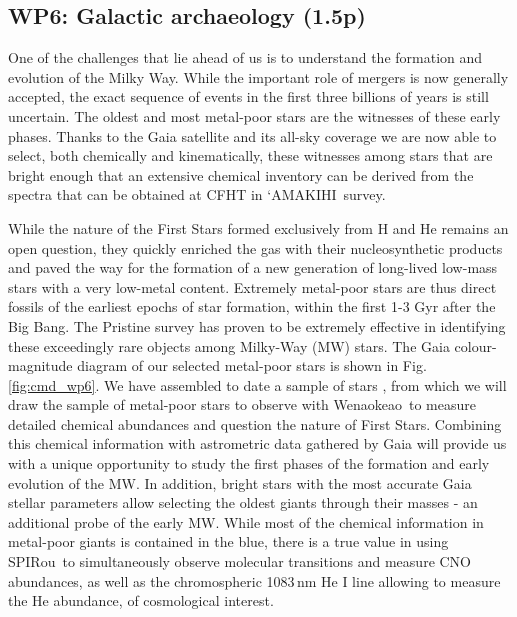 \documentclass[
    traditabstract,
    longauth,
    onecolumn,
]{aa}
\def \amakihi{`AMAKIHI}
\def \spi{SPIRou}
\def \wena{Wenaokeao}
\begin{document}
\subsection{WP6: Galactic archaeology (1.5p)}
One of the challenges that lie ahead of us is to understand the formation and evolution of the Milky Way. While the important role of mergers is now generally accepted, the exact sequence of events in the first three billions of years is still uncertain. The oldest and most metal-poor stars are the witnesses of these early phases. Thanks to the Gaia satellite and its all-sky coverage we are now able to select, both chemically and kinematically, these witnesses among stars that are bright enough that an extensive chemical inventory can be derived from the spectra that can be obtained at CFHT in  \amakihi\ survey. 

While the nature of the First Stars formed exclusively from H and He remains an open question, they quickly enriched the gas with their nucleosynthetic products and paved the way for the formation of a new generation of long-lived low-mass stars with a very low-metal content. Extremely metal-poor stars are thus direct fossils of the earliest epochs of star formation, within the first 1-3 Gyr after the Big Bang. The Pristine survey \citep[][and references therein]{martin_pristine_2024}  has proven to be extremely effective in identifying these exceedingly rare objects among Milky-Way (MW) stars.  The Gaia colour-magnitude diagram of our selected metal-poor stars is shown in Fig.\,\ref{fig:cmd_wp6}.
We have assembled to date a sample of stars \citep{gonzalez_rivera_galactic_2024}, from which we will draw the sample of metal-poor stars to observe with \wena\, to measure detailed chemical abundances and question the nature of First Stars. Combining this chemical information with astrometric data gathered by Gaia will provide us with a unique opportunity to study the first phases of the formation and early evolution of the MW. In addition, bright stars with the most accurate Gaia stellar parameters \citep{recio-blanco_double_2024} allow selecting the oldest giants through their masses - an additional probe of the early MW. While most of the chemical information in metal-poor giants is contained in the blue, there is a true value in using \spi\ to simultaneously observe molecular transitions and measure CNO abundances, as well as the chromospheric 1083\,nm He I line allowing to measure the He abundance, of cosmological interest.\\
\end{document}
